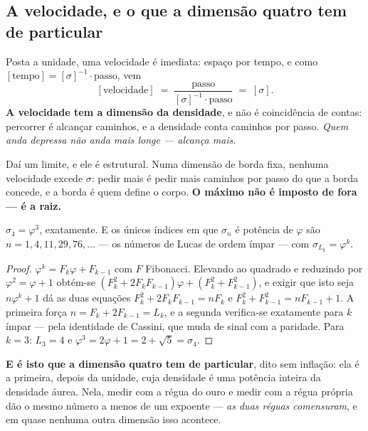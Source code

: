 \documentclass[livro.tex]{subfiles}
\begin{document}
\subsection{A velocidade, e o que a dimensão quatro tem de particular}\label{sec:velocidade}

\noindent Posta a unidade, uma velocidade é imediata: espaço por tempo, e como
$[\text{tempo}]=[\sigma]^{-1}\cdot\text{passo}$, vem
\[
  [\text{velocidade}] \;=\; \frac{\text{passo}}{[\sigma]^{-1}\cdot\text{passo}} \;=\; [\sigma] .
\]
\textbf{A velocidade tem a dimensão da densidade}, e não é coincidência de contas: percorrer é
alcançar caminhos, e a densidade conta caminhos por passo. \emph{Quem anda depressa não anda mais
longe --- alcança mais.}

\medskip
\noindent Daí um limite, e ele é estrutural. Numa dimensão de borda fixa, nenhuma velocidade
excede $\sigma$: pedir mais é pedir mais caminhos por passo do que a borda concede, e a borda é
quem define o corpo. \textbf{O máximo não é imposto de fora --- é a raiz.}

\begin{teorema}\label{thm:sigma4}
$\sigma_4=\varphi^{3}$, exatamente. E os únicos índices em que $\sigma_n$ é potência de
$\varphi$ são $n=1,4,11,29,76,\dots$ --- os números de Lucas de ordem ímpar --- com
$\sigma_{L_k}=\varphi^{k}$.
\end{teorema}

\begin{proof}
$\varphi^{k}=F_k\varphi+F_{k-1}$ com $F$ Fibonacci. Elevando ao quadrado e reduzindo por
$\varphi^{2}=\varphi+1$ obtém-se $(F_k^{2}+2F_kF_{k-1})\varphi+(F_k^{2}+F_{k-1}^{2})$, e exigir
que isto seja $n\varphi^{k}+1$ dá as duas equações $F_k^{2}+2F_kF_{k-1}=nF_k$ e
$F_k^{2}+F_{k-1}^{2}=nF_{k-1}+1$. A primeira força $n=F_k+2F_{k-1}=L_k$, e a segunda verifica-se
exatamente para $k$ ímpar --- pela identidade de Cassini, que muda de sinal com a paridade. Para
$k=3$: $L_3=4$ e $\varphi^{3}=2\varphi+1=2+\sqrt5=\sigma_4$.
\end{proof}


\noindent \textbf{E é isto que a dimensão quatro tem de particular}, dito sem inflação: ela é a
primeira, depois da unidade, cuja densidade é uma potência inteira da densidade áurea. Nela, medir
com a régua do ouro e medir com a régua própria dão o mesmo número a menos de um expoente ---
\emph{as duas réguas comensuram}, e em quase nenhuma outra dimensão isso acontece.
\end{document}
